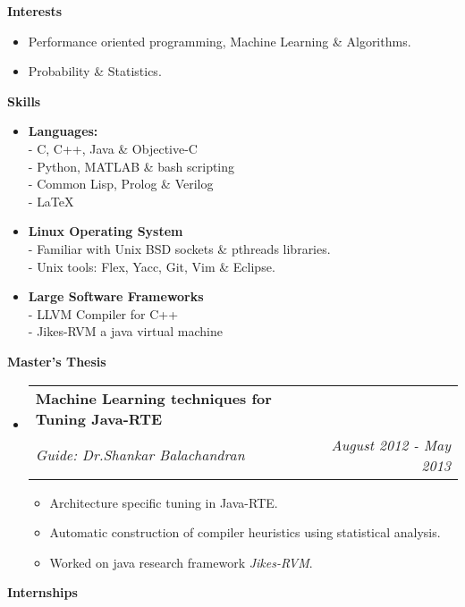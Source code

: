 \documentclass[letterpaper,11pt]{article}
\makeatletter
\newcommand{\resitem}[1]{\item #1 \vspace{-2pt}}
\newcommand{\resheading}[1]{{\large \colorbox{mygrey}{\begin{minipage}{\textwidth}{\textbf{#1 \vphantom{p\^{E}}}}\end{minipage}}}}
\newcommand{\ressubheading}[4]{
\begin{tabular*}{6.5in}{l@{\extracolsep{\fill}}r}
		\textbf{#1} & #2 \\
		\textit{#3} & \textit{#4} \\
\end{tabular*}\vspace{-6pt}}
\makeatother
\begin{document}
\resheading{Interests}
	\begin{itemize}
		\item \footnotesize Performance oriented programming, Machine Learning \& Algorithms. \\
		\item \footnotesize Probability \& Statistics. \\
	\end{itemize}
\resheading{Skills}
	\begin{itemize}
		\item \footnotesize \textbf{Languages: } \\
				 - {C, C++, Java \& Objective-C} \\
				 - {Python, MATLAB \& bash scripting} \\
				 - {Common Lisp, Prolog \& Verilog} \\
				 - {\LaTeX}
		\item \footnotesize \textbf{Linux Operating System} \\
				- {Familiar with Unix BSD sockets \& pthreads libraries.} \\
				- {Unix tools: Flex, Yacc, Git, Vim \& Eclipse.}
		\item \footnotesize \textbf{Large Software Frameworks} \\
				- {LLVM Compiler for C++} \\
				- {Jikes-RVM a java virtual machine}
	\end{itemize}
\resheading{Master's Thesis}
	\begin{itemize}
		\item
			\ressubheading{{Machine Learning techniques for Tuning Java-RTE}}{}{Guide: Dr.Shankar Balachandran}{August 2012 - May 2013}
			{ \footnotesize
			\begin{itemize}
				\resitem{Architecture specific tuning in Java-RTE.}
				\resitem{Automatic construction of compiler heuristics using statistical analysis.}
                \resitem{Worked on java research framework \emph{Jikes-RVM}.}
			\end{itemize}
			}
	\end{itemize}
\resheading{Internships}
\end{document}
